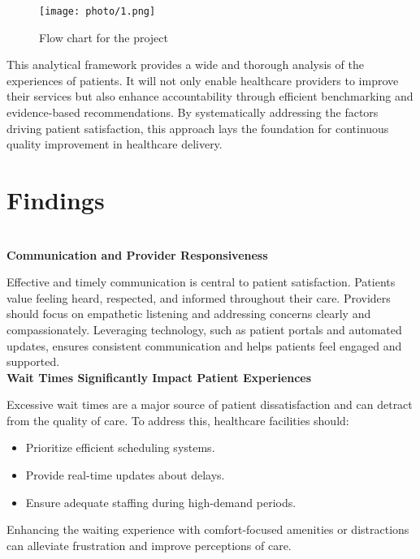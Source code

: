 \begin{figure}[ht]
    \centering
    \texttt{[image: photo/1.png]} %
    \caption{Flow chart for the project}
    \label{fig:flow_chart}
\end{figure}


\vspace{1em}

This analytical framework provides a wide and thorough analysis of the experiences of patients. It will not only enable healthcare providers to improve their services but also enhance accountability through efficient benchmarking and evidence-based recommendations. By systematically addressing the factors driving patient satisfaction, this approach lays the foundation for continuous quality improvement in healthcare delivery.












\section{Findings}\\

\noindent\textbf{Communication and Provider Responsiveness}

\noindent Effective and timely communication is central to patient satisfaction. Patients value feeling heard, respected, and informed throughout their care. Providers should focus on empathetic listening and addressing concerns clearly and compassionately. Leveraging technology, such as patient portals and automated updates, ensures consistent communication and helps patients feel engaged and supported.\\

\noindent\textbf{Wait Times Significantly Impact Patient Experiences}

\noindent Excessive wait times are a major source of patient dissatisfaction and can detract from the quality of care. To address this, healthcare facilities should:
\begin{itemize}
    \item Prioritize efficient scheduling systems.
    \item Provide real-time updates about delays.
    \item Ensure adequate staffing during high-demand periods.
\end{itemize}
Enhancing the waiting experience with comfort-focused amenities or distractions can alleviate frustration and improve perceptions of care.\\

